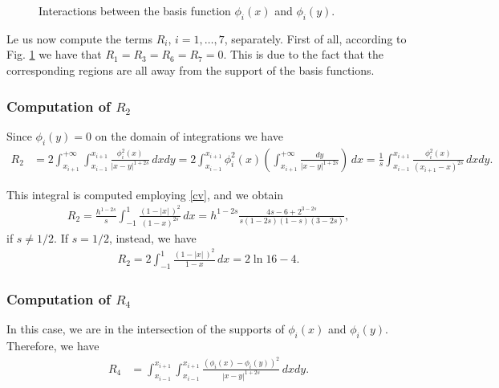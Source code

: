{\begin{figure}
\centerline{\box\figBoxA}
\caption{Interactions between the basis function $\phi_i(x)$ and $\phi_i(y)$.}\label{dia}
\end{figure}
Le us now compute the terms $R_i$, $i=1,\ldots,7$, separately. First of all, according to Fig. \ref{dia} we have that $R_1=R_3=R_6=R_7=0.$ This is due to the fact that the corresponding regions are all away from the support of the basis functions. 
\subsubsection*{Computation of $R_2$}
Since $\phi_i(y) = 0$ on the domain of integrations we have
\begin{align*}
	R_2 &= 2\int_{x_{i+1}}^{+\infty}\int_{x_{i-1}}^{x_{i+1}} \frac{\phi_i^2(x)}{|x-y|^{1+2s}}\,dxdy = 2\int_{x_{i-1}}^{x_{i+1}}\phi_i^2(x)\left(\int_{x_{i+1}}^{+\infty} \frac{dy}{|x-y|^{1+2s}}\right)\,dx = \frac{1}{s}\int_{x_{i-1}}^{x_{i+1}}\frac{\phi_i^2(x)}{(x_{i+1}-x)^{2s}}\,dxdy.
\end{align*}

This integral is computed employing \eqref{cv}, and we obtain
\begin{align}\label{R2}
	R_2 = \frac{h^{1-2s}}{s}\int_{-1}^1 \frac{(1-|x|\,)^2}{(1-x)^{2s}}\,dx = h^{1-2s}\frac{4s-6+2^{3-2s}}{s(1-2s)(1-s)(3-2s)}, 
\end{align}
if $s\neq 1/2$. If $s=1/2$, instead, we have
\begin{align*}
	R_2 = 2\int_{-1}^1 \frac{(1-|x|\,)^2}{1-x}\,dx = 2\ln 16-4.
\end{align*}

\subsubsection*{Computation of $R_4$}
In this case, we are in the intersection of the supports of $\phi_i(x)$ and $\phi_i(y)$. Therefore, we have
\begin{align*}
	R_4 &= \int_{x_{i-1}}^{x_{i+1}}\int_{x_{i-1}}^{x_{i+1}} \frac{(\phi_i(x)-\phi_i(y))^2}{|x-y|^{1+2s}}\,dxdy. 
\end{align*}

}
